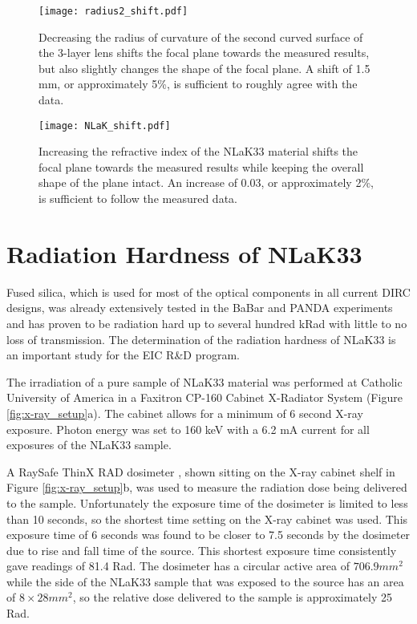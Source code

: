 \begin{figure}[!htb]
	\centering
	\texttt{[image: radius2\_shift.pdf]}
	\caption{Decreasing the radius of curvature of the second curved surface of the 3-layer lens shifts the focal plane towards the measured results, but also slightly changes the shape of the focal plane. A shift of 1.5 mm, or approximately 5\%, is sufficient to roughly agree with the data.}
	\label{fig:radius2_shift}
\end{figure}

\begin{figure}[!htb]
	\centering
	\texttt{[image: NLaK\_shift.pdf]}
	\caption{Increasing the refractive index of the NLaK33 material shifts the focal plane towards the measured results while keeping the overall shape of the plane intact. An increase of 0.03, or approximately 2\%, is sufficient to follow the measured data.}
	\label{fig:NLaK_shift}
\end{figure}

\section{Radiation Hardness of NLaK33}
Fused silica, which is used for most of the optical components in all current DIRC designs, was already extensively tested in the BaBar and PANDA experiments \cite{RadHardness} and has proven to be radiation hard up to several hundred kRad with little to no loss of transmission. The determination of the radiation hardness of NLaK33 is an important study for the EIC R\&D program. 

The irradiation of a pure sample of NLaK33 material was performed at Catholic University of America in a Faxitron CP-160 Cabinet X-Radiator System \cite{XRayCabinet} (Figure \ref{fig:x-ray_setup}a). The cabinet allows for a minimum of 6 second X-ray exposure. Photon energy was set to 160 keV with a 6.2 mA current for all exposures of the NLaK33 sample.

A RaySafe ThinX RAD dosimeter \cite{Dosimeter}, shown sitting on the X-ray cabinet shelf in Figure \ref{fig:x-ray_setup}b, was used to measure the radiation dose being delivered to the sample. Unfortunately the exposure time of the dosimeter is limited to less than 10 seconds, so the shortest time setting on the X-ray cabinet was used. This exposure time of 6 seconds was found to be closer to 7.5 seconds by the dosimeter due to rise and fall time of the source. This shortest exposure time consistently gave readings of 81.4 Rad. The dosimeter has a circular active area of $706.9\unit{mm}^2$ while the side of the NLaK33 sample that was exposed to the source has an area of $8\times28\unit{mm}^2$, so the relative dose delivered to the sample is approximately 25 Rad.

